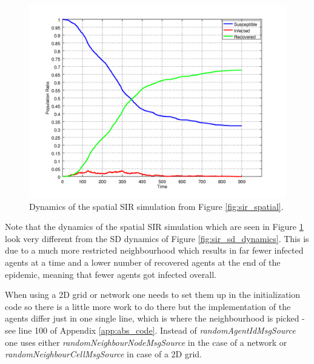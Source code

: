 \begin{figure}
	\centering
	\includegraphics[width=.6\textwidth, angle=0]{./../shared/fig/spatial/SIR_spatial_dynamics_52x52_900time_1dt_parallel.png}
	\caption{Dynamics of the spatial SIR simulation from Figure \ref{fig:sir_spatial}.}
	\label{fig:sir_spatial_dynamics}
\end{figure}

Note that the dynamics of the spatial SIR simulation which are seen in Figure \ref{fig:sir_spatial_dynamics} look very different from the SD dynamics of Figure \ref{fig:sir_sd_dynamics}. This is due to a much more restricted neighbourhood which results in far fewer infected agents at a time and a lower number of recovered agents at the end of the epidemic, meaning that fewer agents got infected overall.

When using a 2D grid or network one needs to set them up in the initialization code so there is a little more work to do there but the implementation of the agents differ just in one single line, which is where the neighbourhood is picked - see line 100 of Appendix \ref{app:abs_code}. Instead of \textit{randomAgentIdMsgSource} one uses either \textit{randomNeighbourNodeMsgSource} in the case of a network or \textit{randomNeighbourCellMsgSource} in case of a 2D grid.